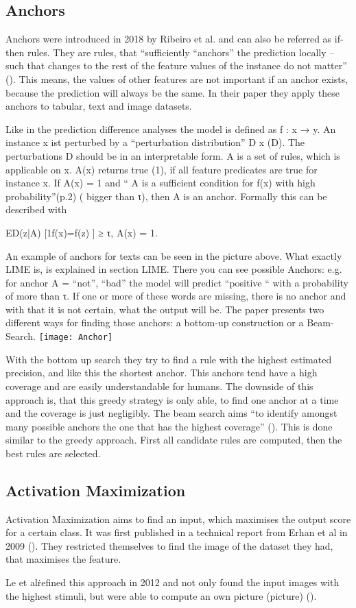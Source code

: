 \subsection{Anchors}
Anchors were introduced in 2018 by Ribeiro et al. and can also be referred as if-then rules. They are rules, that “sufficiently “anchors” the prediction locally – such that changes to the rest of the feature values of the instance do not matter” (). This means, the values of other features are not important if an anchor exists, because the prediction will always be the same. In their paper they apply these anchors to tabular, text and image datasets.
\par
Like in the prediction difference analyses the model is defined as  f : x → y. 
An instance x ist perturbed by a “perturbation distribution” D x (D). The perturbations D should be in an interpretable form. A is a set of rules, which is applicable on x. A(x) returns true (1), if all feature predicates are true for instance x.
If A(x) = 1 and “ A is a sufficient condition for f(x) with high probability”(p.2) ( bigger than τ), then A is an anchor. Formally this can be described with 
\par
 ED(z|A) [1f(x)=f(z) ] ≥ τ, A(x) = 1.
 \par
An example of anchors for texts can be seen in the picture above. What exactly LIME is, is explained in section LIME. There you can see possible Anchors: e.g. for anchor A = {“not”, “bad”} the model will predict “positive “ with a probability of more than τ. If one or more of these words are missing, there is no anchor and with that it is not certain, what the output will be.
The paper presents two different ways for finding those anchors: a bottom-up construction or a Beam-Search.
\texttt{[image: Anchor]}
\par
With the bottom up search they try to find a rule with the highest estimated precision, and like this the shortest anchor. This anchors tend have a high coverage and are easily understandable for humans. 
The downside of this approach is, that this greedy strategy is only able, to find one anchor at a time and the coverage is just negligibly.
The beam search aims “to identify amongst many possible anchors the one that has the highest coverage” (). This is done similar to the greedy approach. First all candidate rules are computed, then the best rules are selected.

\subsection{Activation Maximization}
Activation Maximization aims to find an input, which maximises the output score for a certain class. It was first published in a technical report from Erhan et al in 2009 (). They restricted themselves to find the image of the dataset they had, that maximises the feature.
\par
Le et al\. refined this approach in 2012 and not only found the input images with the highest stimuli, but were able to compute an own picture (picture) ().

